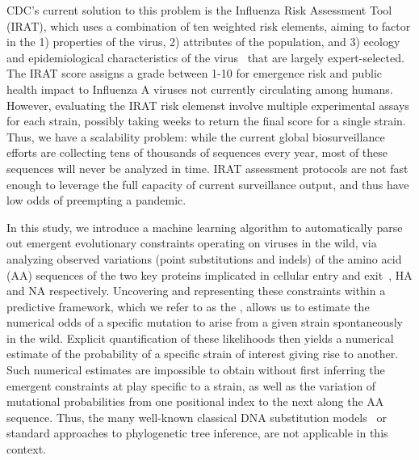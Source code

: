 \documentclass[onecolumn, compsoc,10pt]{IEEEtran}
\begin{document}
CDC's current solution to this problem is the Influenza Risk Assessment Tool (IRAT), which  uses a combination of ten weighted risk elements, aiming to factor in the   1) properties of the virus, 2) attributes of the population, and 3) ecology and epidemiological characteristics of the virus~\cite{Influenz24:online} that are largely  expert-selected. The IRAT score assigns  a grade between 1-10 for emergence risk and public health impact to Influenza A viruses not currently circulating among humans. However, evaluating the IRAT risk elemenst  involve multiple experimental assays for each strain, possibly taking  weeks to return the final   score for a single strain. Thus, we have a scalability problem: while  the current global biosurveillance efforts are collecting tens of thousands of sequences every year, most of these sequences will never be analyzed in time. IRAT assessment protocols are  not fast enough to leverage the full capacity of current surveillance output, and thus have low odds of  preempting a pandemic.

In this study, we introduce a machine learning algorithm to automatically parse out emergent evolutionary constraints operating on \infl viruses in the wild, via analyzing observed variations (point substitutions and indels) of the  amino acid (AA)  sequences  of the two key proteins implicated  in cellular entry and exit~\cite{gamblin2010influenza}, HA and NA respectively. Uncovering and representing these constraints within a predictive framework, which we refer to as the \enet, allows us to estimate the numerical odds of a specific mutation to arise from a given strain  spontaneously in the wild. Explicit quantification of these likelihoods then yields a numerical estimate of the probability of a specific strain of interest giving rise to another. Such numerical estimates are impossible to obtain without first inferring the emergent constraints at play specific to a strain,  as well as  the variation of mutational probabilities from one positional index to the next along the AA sequence. Thus, the many well-known classical  DNA  substitution models~\cite{posada1998modeltest} or standard approaches to phylogenetic tree inference, are not applicable in this context. 
\end{document}
